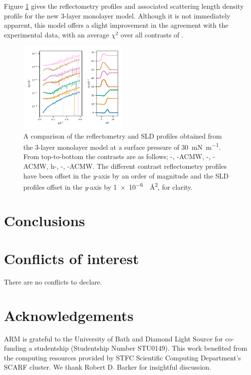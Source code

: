 \documentclass[twoside,twocolumn,9pt]{article}
\begin{document}
Figure \ref{fig:mod} gives the reflectometry profiles and associated scattering length density profile for the new 3-layer monolayer model.
Although it is not immediately apparent, this model offers a slight improvement in the agreement with the experimental data, with an average $\chi^2$ over all contrasts of .

%
\begin{figure}[h]
\centering
  \includegraphics[width=0.48\textwidth]{figures/trad_30_mod}
  \caption{A comparison of the reflectometry and SLD profiles obtained from the 3-layer monolayer model at a surface pressure of \SI{30}{\milli\newton\per\meter}. From top-to-bottom the contrasts are as follows; -, -ACMW, -, -ACMW, h-, -, -ACMW. The different contrast reflectometry profiles have been offset in the \emph{y}-axis by an order of magnitude and the SLD profiles offset in the \emph{y}-axis by \SI{1e-6}{\per\square\angstrom}, for clarity.}
  \label{fig:mod}
\end{figure}
%



\section{Conclusions}

\section*{Conflicts of interest}
There are no conflicts to declare.

\section*{Acknowledgements}
ARM is grateful to the University of Bath and Diamond Light Source for co-funding a studentship (Studentship Number STU0149). This work benefited from the computing resources provided by STFC Scientific Computing Department's SCARF cluster. We thank Robert D. Barker for insightful discussion.
\end{document}
